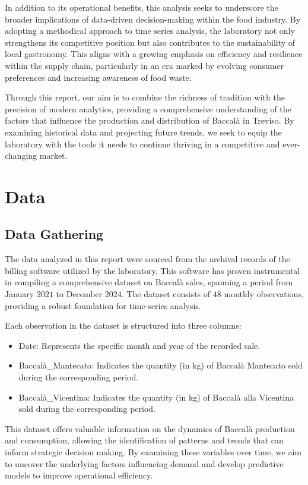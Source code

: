 \documentclass[10pt,twocolumn,letterpaper]{article}
\begin{document}
In addition to its operational benefits, this analysis seeks to underscore the broader implications of data-driven decision-making within the food industry. By adopting a methodical approach to time series analysis, the laboratory not only strengthens its competitive position but also contributes to the sustainability of local gastronomy. This aligns with a growing emphasis on efficiency and resilience within the supply chain, particularly in an era marked by evolving consumer preferences and increasing awareness of food waste.

Through this report, our aim is to combine the richness of tradition with the precision of modern analytics, providing a comprehensive understanding of the factors that influence the production and distribution of Baccalà in Treviso. By examining historical data and projecting future trends, we seek to equip the laboratory with the tools it needs to continue thriving in a competitive and ever-changing market.

\section{Data}
\subsection{Data Gathering}
The data analyzed in this report were sourced from the archival records of the billing software utilized by the laboratory. This software has proven instrumental in compiling a comprehensive dataset on Baccalà sales, spanning a period from January $2021$ to December $2024$. The dataset consists of $48$ monthly observations, providing a robust foundation for time-series analysis.

Each observation in the dataset is structured into three columns:
\begin{itemize}
    \item Date: Represents the specific month and year of the recorded sale.
    \item Baccalà\_Mantecato: Indicates the quantity (in kg) of Baccalà Mantecato sold during the corresponding period.
    \item Baccalà\_Vicentina: Indicates the quantity (in kg) of Baccalà alla Vicentina sold during the corresponding period.
\end{itemize}


This dataset offers valuable information on the dynamics of Baccalà production and consumption, allowing the identification of patterns and trends that can inform strategic decision making. By examining these variables over time, we aim to uncover the underlying factors influencing demand and develop predictive models to improve operational efficiency.
\end{document}
